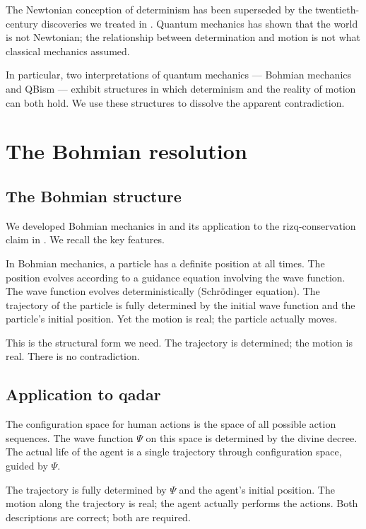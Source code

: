 The Newtonian conception of determinism has been superseded by the
twentieth-century discoveries we treated in
. Quantum mechanics has shown that
the world is not Newtonian; the relationship between
determination and motion is not what classical mechanics
assumed.

In particular, two interpretations of quantum mechanics ---
Bohmian mechanics and QBism --- exhibit structures in which
determinism and the reality of motion can both hold. We use these
structures to dissolve the apparent contradiction.

\section{The Bohmian resolution}
\label{sec:qad-bohmian-resolution}

\subsection{The Bohmian structure}

We developed Bohmian mechanics in  and
its application to the rizq-conservation claim in
. We recall the key features.

In Bohmian mechanics, a particle has a definite position at all
times. The position evolves according to a guidance equation
involving the wave function. The wave function evolves
deterministically (Schr\"odinger equation). The trajectory of the
particle is fully determined by the initial wave function and the
particle's initial position. Yet the motion is real; the particle
actually moves.

This is the structural form we need. The trajectory is determined;
the motion is real. There is no contradiction.

\subsection{Application to qadar}

\begin{conceptbox}
\label{conc:bohmian-qadar}
The configuration space for human actions is the space of all
possible action sequences. The wave function $\Psi$ on this
space is determined by the divine decree. The actual life of the
agent is a single trajectory through configuration space, guided
by $\Psi$.

The trajectory is fully determined by $\Psi$ and the agent's
initial position. The motion along the trajectory is real; the
agent actually performs the actions. Both descriptions are
correct; both are required.
\end{conceptbox}

